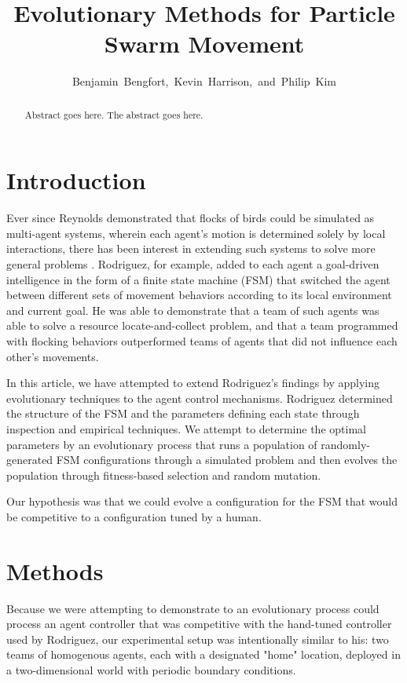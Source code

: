 \documentclass[12pt,journal,compsoc]{IEEEtran}
\begin{document}
\title{Evolutionary Methods for Particle Swarm Movement}
\author{Benjamin~Bengfort,~Kevin~Harrison,~and~Philip~Kim}

\maketitle

\begin{abstract}
Abstract goes here.
The abstract goes here.
\end{abstract}

\section{Introduction}

Ever since Reynolds demonstrated that flocks of birds could be simulated as multi-agent systems, wherein each agent's motion is determined solely by local interactions, there has been interest in extending such systems to solve more general problems \cite{reynolds1987flocks}. Rodriguez, for example, added to each agent a goal-driven intelligence in the form of a finite state machine (FSM) that switched the agent between different sets of movement behaviors according to its local environment and current goal. He was able to demonstrate that a team of such agents was able to solve a resource locate-and-collect problem, and that a team programmed with flocking behaviors outperformed teams of agents that did not influence each other's movements.

In this article, we have attempted to extend Rodriguez's findings by applying evolutionary techniques to the agent control mechanisms. Rodriguez determined the structure of the FSM and the parameters defining each state through inspection and empirical techniques. We attempt to determine the optimal parameters by an evolutionary process that runs a population of randomly-generated FSM configurations through a simulated problem and then evolves the population through fitness-based selection and random mutation.

Our hypothesis was that we could evolve a configuration for the FSM that would be competitive to a configuration tuned by a human.

\section{Methods}

Because we were attempting to demonstrate to an evolutionary process could process an agent controller that was  competitive with the hand-tuned controller used by Rodriguez, our experimental setup was intentionally similar to his: two teams of homogenous agents, each with a designated "home" location, deployed in a two-dimensional world with periodic boundary conditions.
\end{document}
